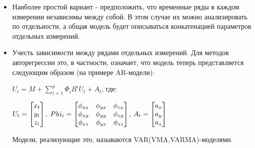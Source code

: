 \begin{itemize}
\item Наиболее простой вариант - предположить, что временные ряды в каждом измерении независимы между собой. В этом случае их можно анализировать по отдельности, а общая модель будет описываться конкатенацией параметров отдельных измерений.
\item Учесть зависимости между рядами отдельных измерений. Для методов авторегрессии это, в частности, означает, что модель теперь представляется следующим образом (на примере AR-модели):

$U_t=M+\sum_{i=1}^p \Phi_iB^i U_t + A_t$,  где:

 $U_t=\begin{bmatrix} x_t \\ y_t \\ z_t \\ \end{bmatrix}$, $Phi_i=\begin{bmatrix} \phi_{xx} & \phi_{yx} & \phi_{zx} \\ \phi_{xy} & \phi_{yy} & \phi_{zy} \\ \phi_{xz} & \phi_{yz} & \phi_{zz} \\ \end{bmatrix}$, 
 $A_t=\begin{bmatrix} a_x \\ a_y \\ a_z \\ \end{bmatrix}$

Модели, реализующие это, называются VAR(VMA,VARMA)-моделями. 
\end{itemize}

